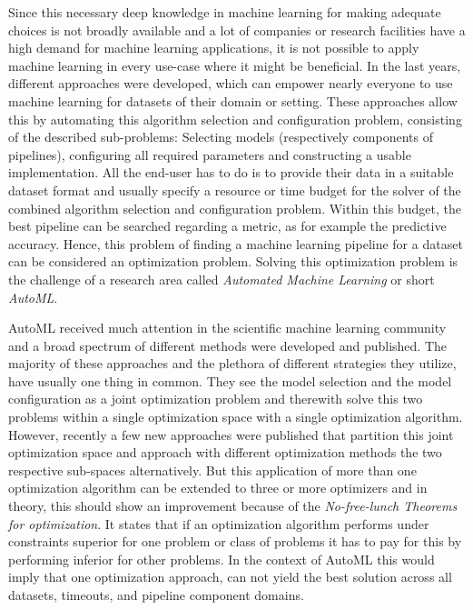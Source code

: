 Since this necessary deep knowledge in machine learning for making adequate choices is not broadly available and a lot of companies or research facilities have a high demand for machine learning applications, it is not possible to apply machine learning in every use-case where it might be beneficial.\newline
In the last years, different approaches were developed, which can empower nearly everyone to use machine learning for datasets of their domain or setting.
These approaches allow this by automating this algorithm selection and configuration problem, consisting of the described sub-problems: Selecting models (respectively components of pipelines), configuring all required parameters and constructing a usable implementation.
All the end-user has to do is to provide their data in a suitable dataset format and usually specify a resource or time budget for the solver of the combined algorithm selection and configuration problem.\newline
Within this budget, the best pipeline can be searched regarding a metric, as for example the predictive accuracy.
Hence, this problem of finding a machine learning pipeline for a dataset can be considered an optimization problem.
Solving this optimization problem is the challenge of a research area called \textit{Automated Machine Learning} or short \textit{AutoML}.

AutoML received much attention in the scientific machine learning community and a broad spectrum of different methods were developed and published.
The majority of these approaches and the plethora of different strategies they utilize, have usually one thing in common.
They see the model selection and the model configuration as a joint optimization problem and therewith solve this two problems within a single optimization space with a single optimization algorithm.\newline
However, recently a few new approaches were published that partition this joint optimization space and approach with different optimization methods the two respective sub-spaces alternatively.
But this application of more than one optimization algorithm can be extended to three or more optimizers and in theory, this should show an improvement because of the \textit{No-free-lunch Theorems for optimization}.
It states that if an optimization algorithm performs under constraints superior for one problem or class of problems it has to pay for this by performing inferior for other problems.
In the context of AutoML this would imply that one optimization approach, can not yield the best solution across all datasets, timeouts, and pipeline component domains.

